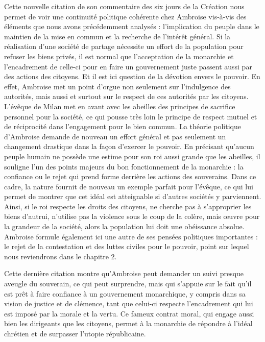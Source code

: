 \bigskip

Cette nouvelle citation de son commentaire des six jours de la Création nous permet de voir une continuité politique cohérente chez Ambroise vis-à-vis des éléments que nous avons précédemment analysés : l'implication du peuple dans le maintien de la mise en commun et la recherche de l'intérêt général. Si la réalisation d'une société de partage nécessite un effort de la population pour refuser les biens privés, il est normal que l'acceptation de la monarchie et l'encadrement de celle-ci pour en faire un gouvernement juste passent aussi par des actions des citoyens. Et il est ici question de la dévotion envers le pouvoir. En effet, Ambroise met un point d'orgue non seulement sur l'indulgence des autorités, mais aussi et surtout sur le respect de ces autorités par les citoyens. L'évêque de Milan met en avant avec les abeilles des principes de sacrifice personnel pour la société, ce qui pousse très loin le principe de respect mutuel et de réciprocité dans l'engagement pour le bien commun. La théorie politique d'Ambroise demande de nouveau un effort général et pas seulement un changement drastique dans la façon d'exercer le pouvoir. En précisant qu'aucun peuple humain ne possède une estime pour son roi aussi grande que les abeilles, il souligne l'un des points majeurs du bon fonctionnement de la monarchie : la confiance ou le rejet qui prend forme derrière les actions des souverains. Dans ce cadre, la nature fournit de nouveau un exemple parfait pour l'évêque, ce qui lui permet de montrer que cet idéal est atteignable si d'autres sociétés y parviennent. Ainsi, si le roi respecte les droits des citoyens, ne cherche pas à s'approprier les biens d'autrui, n'utilise pas la violence sous le coup de la colère, mais œuvre pour la grandeur de la société, alors la population lui doit une obéissance absolue. Ambroise formule également ici une autre de ses pensées politiques importantes : le rejet de la contestation et des luttes civiles pour le pouvoir, point sur lequel nous reviendrons dans le chapitre 2.

\bigskip

Cette dernière citation montre qu'Ambroise peut demander un suivi presque aveugle du souverain, ce qui peut surprendre, mais qui s'appuie sur le fait qu'il est prêt à faire confiance à un gouvernement monarchique, y compris dans sa vision de justice et de clémence, tant que celui-ci respecte l'encadrement qui lui est imposé par la morale et la vertu. Ce fameux contrat moral, qui engage aussi bien les dirigeants que les citoyens, permet à la monarchie de répondre à l'idéal chrétien et de surpasser l'utopie républicaine.

